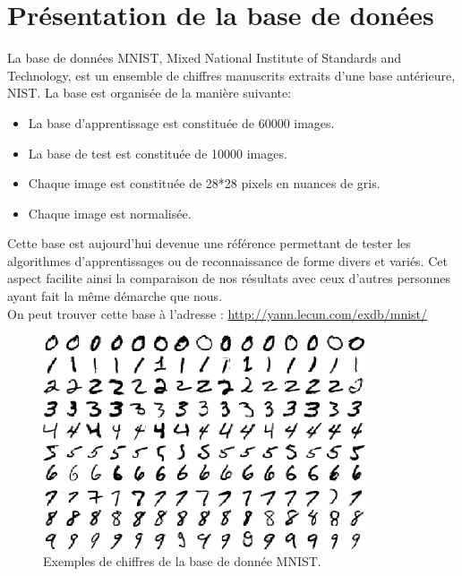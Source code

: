 \documentclass[a4paper,oneside]{report}
\begin{document}
            \section{Présentation de la base de donées}

                La base de données MNIST, Mixed National Institute of Standards and Technology, 
est un ensemble de chiffres manuscrits extraits d'une base antérieure, NIST. La base 
est organisée de la manière 
suivante:

                \begin{itemize}
                    \item La base d'apprentissage est constituée de 60000 images.
                    \item La base de test est constituée de 10000 images.
                    \item Chaque image est constituée de 28*28 pixels en nuances de gris.
                    \item Chaque image est normalisée.\\
                \end{itemize}

                Cette base est aujourd'hui devenue une référence permettant de tester les algorithmes 
d'apprentissages ou de reconnaissance de forme divers et variés. Cet aspect facilite 
ainsi la comparaison de nos 
résultats avec ceux d'autres personnes ayant fait la même démarche que nous.\\   
On peut trouver cette base à l'adresse : \url{http://yann.lecun.com/exdb/mnist/}\\

                \begin{figure}[!ht]
                    \begin{center}
                        \includegraphics[width = 270pt]{Images/mnist-01.png}
                    \end{center}
                    \caption{Exemples de chiffres de la base de donnée MNIST.}
                \end{figure}
\end{document}
